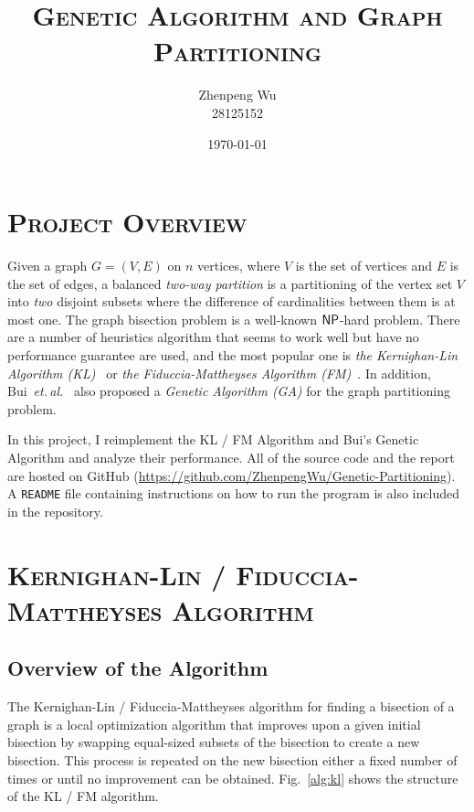 \documentclass[11pt]{article}
\title{\textbf{\textsc{Genetic Algorithm and Graph Partitioning}}}
\date{
    \today
}
\author{
  Zhenpeng Wu\\
  28125152
}
\begin{document}
\maketitle

\section{\textsc{Project Overview}}

Given a graph \(G = (V, E)\) on \(n\) vertices, where \(V\) is the set of vertices and \(E\) is the 
set of edges, a balanced \textit{two-way partition} is a partitioning of the vertex set \(V\) into 
\textit{two} disjoint subsets where the difference of cardinalities between them is at most one. The
graph bisection problem is a well-known \(\mathsf {NP}\)-hard problem. There are a number of heuristics 
algorithm that seems to work well but have no performance guarantee are used, and the most popular 
one is \textit{the Kernighan-Lin Algorithm (KL)}~\cite{6771089} or \textit{the Fiduccia-Mattheyses Algorithm (FM)}~\cite{1585498}. 
In addition, Bui~\textit{et.\,al.}~\cite{508322} also proposed a \textit{Genetic Algorithm (GA)} for 
the graph partitioning problem.

In this project, I reimplement the KL / FM Algorithm and Bui's Genetic Algorithm and analyze their 
performance. All of the source code and the report are hosted on GitHub (\url{https://github.com/ZhenpengWu/Genetic-Partitioning}). 
A \texttt{README} file containing instructions on how to run the program is also included in the 
repository.

\section{\textsc{Kernighan-Lin / Fiduccia-Mattheyses Algorithm}}

\subsection{Overview of the Algorithm}

The Kernighan-Lin / Fiduccia-Mattheyses algorithm for finding a bisection of a graph is a local 
optimization algorithm that improves upon a given initial bisection by swapping equal-sized subsets 
of the bisection to create a new bisection. This process is repeated on the new bisection either a 
fixed number of times or until no improvement can be obtained. Fig.~\ref{alg:kl} shows the structure 
of the KL / FM algorithm.
\end{document}
